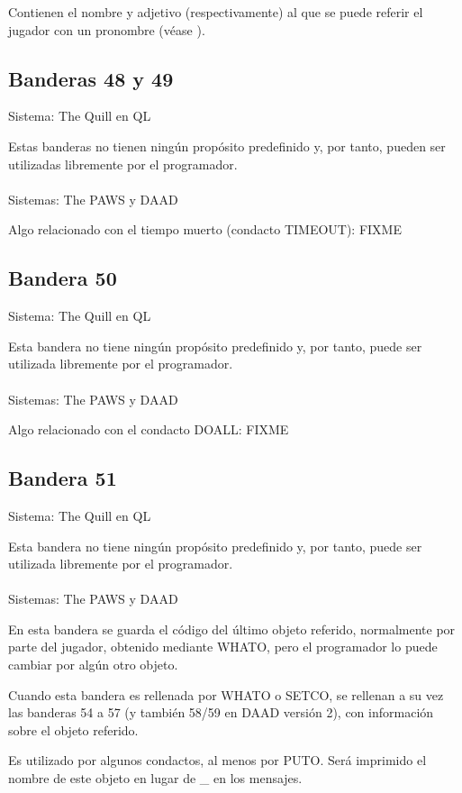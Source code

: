 \documentclass[11pt, a5paper]{article}
\newcommand{\quill}{\textsf{The Quill}\xspace}
\newcommand{\paw}{\textsf{The PAWS}\xspace}
\newcommand{\daad}{\textsf{DAAD}\xspace}
\newcommand{\sistema}[1]{\noindent Sistema: #1 \nopagebreak}
\newcommand{\sistemas}[1]{\noindent Sistemas: #1 \nopagebreak}
\begin{document}
Contienen el nombre y adjetivo (respectivamente) al que se puede referir el jugador con un pronombre (véase \textbf{}).

\subsection{Banderas 48 y 49}

\sistema{\quill en QL}

Estas banderas no tienen ningún propósito predefinido y, por tanto, pueden ser utilizadas libremente por el programador.
\\\ \\
\sistemas{\paw y \daad}

Algo relacionado con el tiempo muerto (condacto TIMEOUT): FIXME

\subsection{Bandera 50}

\sistema{\quill en QL}

Esta bandera no tiene ningún propósito predefinido y, por tanto, puede ser utilizada libremente por el programador.
\\\ \\
\sistemas{\paw y \daad}

Algo relacionado con el condacto DOALL: FIXME

\subsection{Bandera 51}

\sistema{\quill en QL}

Esta bandera no tiene ningún propósito predefinido y, por tanto, puede ser utilizada libremente por el programador.
\\\ \\
\sistemas{\paw y \daad}

En esta bandera se guarda el código del último objeto referido, normalmente por parte del jugador, obtenido mediante WHATO, pero el programador lo puede cambiar por algún otro objeto.

Cuando esta bandera es rellenada por WHATO o SETCO, se rellenan a su vez las banderas 54 a 57 (y también 58/59 en \daad versión 2), con información sobre el objeto referido.

Es utilizado por algunos condactos, al menos por PUTO. Será imprimido el nombre de este objeto en lugar de \_ en los mensajes.
\end{document}
